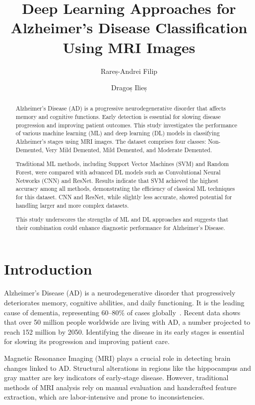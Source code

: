 \documentclass[runningheads]{llncs}
\title{Deep Learning Approaches for Alzheimer’s Disease Classification Using MRI Images}
\author{Rareș-Andrei Filip\inst{1} \and Dragoș Ilieș\inst{1}}
\institute{
Faculty of Economics and Business Administration (FSEGA), \\
Babeș-Bolyai University (UBB), Cluj-Napoca, Romania
}
\begin{document}
\maketitle
\pagestyle{plain}

\begin{abstract}
    Alzheimer's Disease (AD) is a progressive neurodegenerative disorder that affects memory and cognitive functions. Early detection is essential for slowing disease progression and improving patient outcomes. This study investigates the performance of various machine learning (ML) and deep learning (DL) models in classifying Alzheimer's stages using MRI images. The dataset comprises four classes: Non-Demented, Very Mild Demented, Mild Demented, and Moderate Demented.

    Traditional ML methods, including Support Vector Machines (SVM) and Random Forest, were compared with advanced DL models such as Convolutional Neural Networks (CNN) and ResNet. Results indicate that SVM achieved the highest accuracy among all methods, demonstrating the efficiency of classical ML techniques for this dataset. CNN and ResNet, while slightly less accurate, showed potential for handling larger and more complex datasets.

    This study underscores the strengths of ML and DL approaches and suggests that their combination could enhance diagnostic performance for Alzheimer's Disease.
\end{abstract}

\section{Introduction}

Alzheimer's Disease (AD) is a neurodegenerative disorder that progressively deteriorates memory, cognitive abilities, and daily functioning. It is the leading cause of dementia, representing 60–80\% of cases globally~\cite{helaly2021}. Recent data shows that over 50 million people worldwide are living with AD, a number projected to reach 152 million by 2050. Identifying the disease in its early stages is essential for slowing its progression and improving patient care.

Magnetic Resonance Imaging (MRI) plays a crucial role in detecting brain changes linked to AD. Structural alterations in regions like the hippocampus and gray matter are key indicators of early-stage disease. However, traditional methods of MRI analysis rely on manual evaluation and handcrafted feature extraction, which are labor-intensive and prone to inconsistencies.
\end{document}
